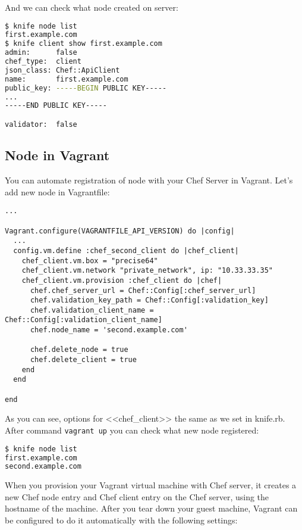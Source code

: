 And we can check what node created on server:

\begin{lstlisting}[language=Bash,label=lst:my-server-cloud-node6]
$ knife node list
first.example.com
$ knife client show first.example.com
admin:      false
chef_type:  client
json_class: Chef::ApiClient
name:       first.example.com
public_key: -----BEGIN PUBLIC KEY-----
...
-----END PUBLIC KEY-----

validator:  false
\end{lstlisting}

\subsection{Node in Vagrant}

You can automate registration of node with your Chef Server in Vagrant. Let's add new node in Vagrantfile:

\begin{lstlisting}[label=lst:my-server-cloud-node7,title=my-server-cloud/Vagrantfile]
...

Vagrant.configure(VAGRANTFILE_API_VERSION) do |config|
  ...
  config.vm.define :chef_second_client do |chef_client|
    chef_client.vm.box = "precise64"
    chef_client.vm.network "private_network", ip: "10.33.33.35"
    chef_client.vm.provision :chef_client do |chef|
      chef.chef_server_url = Chef::Config[:chef_server_url]
      chef.validation_key_path = Chef::Config[:validation_key]
      chef.validation_client_name = Chef::Config[:validation_client_name]
      chef.node_name = 'second.example.com'

      chef.delete_node = true
      chef.delete_client = true
    end
  end

end
\end{lstlisting}

As you can see, options for <<chef\_client>> the same as we set in knife.rb. After command \lstinline!vagrant up! you can check what new node registered:

\begin{lstlisting}[language=Bash,label=lst:my-server-cloud-node10]
$ knife node list
first.example.com
second.example.com
\end{lstlisting}

When you provision your Vagrant virtual machine with Chef server, it creates a new Chef node entry and Chef client entry on the Chef server, using the hostname of the machine. After you tear down your guest machine, Vagrant can be configured to do it automatically with the following settings:

